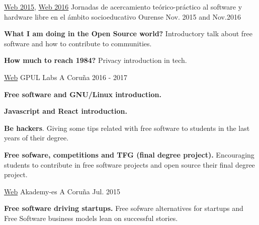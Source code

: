 


\begin{cventries}


\cventry
{\href{https://lignux.com/material-de-las-ii-jornadas-de-acercamiento-teorico-practico-al-software-y-hardware-libre-2015/}{Web 2015},
\href{https://lignux.com/material-de-las-iii-jornadas-de-acercamiento-teorico-practico-al-software-y-hardware-libre-2016/}{Web 2016}} 
{Jornadas de acercamiento teórico-práctico al software y hardware libre en 
el ámbito socioeducativo} %
{Ourense} %
{Nov. 2015 and Nov.2016} %
{ %
\begin{cvitems}
\item {\textbf{What I am doing in the Open Source world?} Introductory talk 
about free software and how to contribute to 
communities.}
\item {\textbf{How much to reach 1984?} Privacy introduction in tech.}
\end{cvitems}
}


\cventry
{\href{https://labs.gpul.org/}{Web}} 
{GPUL Labs} %
{A Coruña} %
{2016 - 2017} %
{ %
\begin{cvitems}
\item{\textbf{Free software and GNU/Linux introduction.}}
\item{\textbf{Javascript and React introduction.}}
\item{\textbf{Be hackers}. Giving some tips related with free software to 
students in the last years of their degree.}
\item{\textbf{Free sofware, competitions and TFG (final degree project).} 
Encouraging students to contribute in free software projects and open source 
their final degree project.}
\end{cvitems}
}


\cventry
{\href{https://www.kde-espana.org/akademy-es2015/index.php}{Web}} %
{Akademy-es} %
{A Coruña} %
{Jul. 2015} %
{ %
\begin{cvitems}
\item {\textbf{Free software driving startups.} Free sofware alternatives for 
startups and Free Software business models lean on successful stories.}
\end{cvitems}
}



\end{cventries}